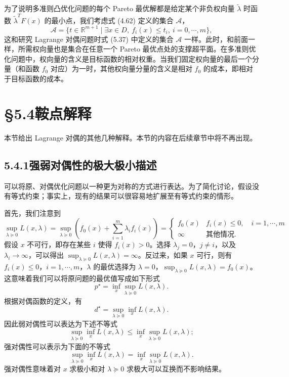\documentclass[UTF8,12pt,a4paper,fontset=fandol]{ctexart}
\begin{document}
为了说明多准则凸优化问题的每个 Pareto 最优解都是给定某个非负权向量 $\tilde{\lambda}$ 时函数 $\tilde{\lambda}^TF(x)$ 的最小点，我们考虑式 (4.62) 定义的集合 $\mathcal{A}$，
\[
\mathcal{A}=\{t\in\mathbb{R}^{m+1}\mid \exists x\in D,\ f_i(x)\leq t_i,\ i=0,\cdots,m\},
\]
这和研究 Lagrange 对偶问题时式 (5.37) 中定义的集合 $\mathcal{A}$ 一样。此时，和前面一样，所需权向量也是集合在任意一个 Pareto 最优点处的支撑超平面。在多准则优化问题中，权向量的含义是目标函数的相对权重。当我们固定权向量的最后一个分量（和函数 $f_0$ 对应）为一时，其他权向量分量的含义是相对 $f_0$ 的成本，即相对于目标函数的成本。

\section*{§5.4\quad 鞍点解释}

本节给出 Lagrange 对偶的其他几种解释。本节的内容在后续章节中将不再出现。

\subsection*{5.4.1\quad 强弱对偶性的极大极小描述}

可以将原、对偶优化问题以一种更为对称的方式进行表达。为了简化讨论，假设没有等式约束；事实上，现有的结果可以很容易地扩展至有等式约束的情形。

首先，我们注意到
\[
\sup_{\lambda\succeq 0}L(x,\lambda)
=\sup_{\lambda\succeq 0}\left(f_0(x)+\sum_{i=1}^m\lambda_i f_i(x)\right)
=
\begin{cases}
f_0(x) & f_i(x)\leq 0,\quad i=1,\cdots,m\\
\infty & \text{其他情况}.
\end{cases}
\]
假设 $x$ 不可行，即存在某些 $i$ 使得 $f_i(x)>0$。选择 $\lambda_j=0$，$j\neq i$，以及 $\lambda_i\to\infty$，可以得出 $\sup_{\lambda\succeq 0}L(x,\lambda)=\infty$。反过来，如果 $x$ 可行，则有 $f_i(x)\leq 0$，$i=1,\cdots,m$，$\lambda$ 的最优选择为 $\lambda=0$，$\sup_{\lambda\succeq 0}L(x,\lambda)=f_0(x)$。这意味着我们可以将原问题的最优值写成如下形式
\[
p^\star=\inf_x\sup_{\lambda\succeq 0}L(x,\lambda).
\]
根据对偶函数的定义，有
\[
d^\star=\sup_{\lambda\succeq 0}\inf_x L(x,\lambda).
\]
因此弱对偶性可以表达为下述不等式
\begin{equation}
\sup_{\lambda\succeq 0}\inf_x L(x,\lambda)
\leq
\inf_x\sup_{\lambda\succeq 0}L(x,\lambda);
\tag{5.45}
\end{equation}
强对偶性可以表示为下面的不等式
\[
\sup_{\lambda\succeq 0}\inf_x L(x,\lambda)
=
\inf_x\sup_{\lambda\succeq 0}L(x,\lambda).
\]
强对偶性意味着对 $x$ 求极小和对 $\lambda\succeq 0$ 求极大可以互换而不影响结果。
\end{document}
